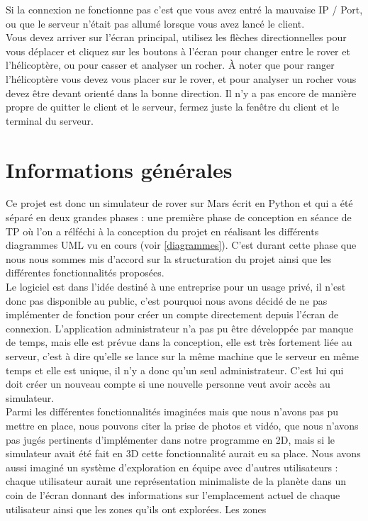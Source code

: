 \documentclass[12pt,a4paper]{scrartcl}
\begin{document}
Si la connexion ne fonctionne pas c'est que vous avez entré la mauvaise IP / Port, ou que le serveur n'était pas allumé lorsque vous avez lancé le client.\\
Vous devez arriver sur l'écran principal, utilisez les flèches directionnelles pour vous déplacer et cliquez sur les boutons à l'écran pour
changer entre le rover et l'hélicoptère, ou pour casser et analyser un rocher. À noter que pour ranger l'hélicoptère vous devez vous placer sur le rover, et pour
analyser un rocher vous devez être devant orienté dans la bonne direction. Il n'y a pas encore de manière propre de quitter le client et le serveur, fermez juste la fenêtre
du client et le terminal du serveur.

\section{Informations générales}
Ce projet est donc un simulateur de rover sur Mars écrit en Python et qui a été séparé en deux grandes phases :
une première phase de conception en séance de TP où l'on a rélféchi à la conception du projet en réalisant
les différents diagrammes UML vu en cours (voir \ref{diagrammes}). C'est durant cette phase que nous nous sommes mis d'accord
sur la structuration du projet ainsi que les différentes fonctionnalités proposées.\\
Le logiciel est dans l'idée destiné à une entreprise pour un usage privé, il n'est donc pas disponible
au public, c'est pourquoi nous avons décidé de ne pas implémenter de fonction pour créer un compte directement depuis
l'écran de connexion. L'application administrateur n'a pas pu être développée par manque de temps, mais elle est prévue
dans la conception, elle est très fortement liée au serveur, c'est à dire qu'elle se lance sur la même machine que le serveur
en même temps et elle est unique, il n'y a donc qu'un seul administrateur. C'est lui qui doit créer un nouveau compte si une nouvelle
personne veut avoir accès au simulateur.\\
Parmi les différentes fonctionnalités imaginées mais que nous n'avons pas pu mettre en place, nous pouvons citer
la prise de photos et vidéo, que nous n'avons pas jugés pertinents d'implémenter dans notre programme en 2D, mais si
le simulateur avait été fait en 3D cette fonctionnalité aurait eu sa place. Nous avons aussi imaginé un système d'exploration
en équipe avec d'autres utilisateurs : chaque utilisateur aurait une représentation minimaliste de la planète dans un coin de l'écran
donnant des informations sur l'emplacement actuel de chaque utilisateur ainsi que les zones qu'ils ont explorées. Les zones
\end{document}
